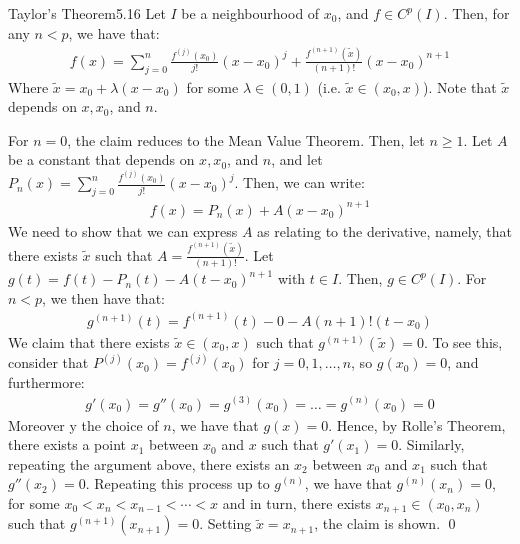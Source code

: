\begin{theorem}{Taylor's Theorem}{5.16}
    Let $I$ be a neighbourhood of $x_0$, and $f \in C^p(I)$. Then, for any $n < p$, we have that:
    \begin{align*}
        f(x) = \sum_{j=0}^n \frac{f^{(j)}(x_0)}{j!}(x- x_0)^j + \frac{f^{(n+1)}(\tilde{x})}{(n+1)!}(x - x_0)^{n+1}
    \end{align*}
    Where $\tilde{x} = x_0 + \lambda(x - x_0)$ for some $\lambda \in (0, 1)$ (i.e. $\tilde{x} \in (x_0, x)$). Note that $\tilde{x}$ depends on $x, x_0$, and $n$. 
\end{theorem}
\begin{nproof}
    For $n = 0$, the claim reduces to the Mean Value Theorem. Then, let $n \geq 1$. Let $A$ be a constant that depends on $x, x_0$, and $n$, and let $P_n(x) = \sum_{j=0}^n \frac{f^{(j)}(x_0)}{j!}(x-x_0)^j$. Then, we can write:
    \begin{align*}
        f(x) = P_n(x) + A(x-x_0)^{n+1}
    \end{align*}
    We need to show that we can express $A$ as relating to the derivative, namely, that there exists $\tilde{x}$ such that $A = \frac{f^{(n+1)}(\tilde{x})}{(n+1)!}$. Let $g(t) = f(t) - P_n(t) - A(t - x_0)^{n+1}$ with $t \in I$. Then, $g \in C^{p}(I)$. For $n < p$, we then have that:
    \begin{align*}
        g^{(n+1)}(t) = f^{(n+1)}(t) - 0 - A(n+1)!(t - x_0)
    \end{align*}
    We claim that there exists $\tilde{x} \in (x_0, x)$ such that $g^{(n+1)}(\tilde{x}) = 0$. To see this, consider that $P^{(j)}(x_0) = f^{(j)}(x_0)$ for $j = 0, 1, \ldots, n$, so $g(x_0) = 0$, and furthermore:
    \begin{align*}
        g'(x_0) = g''(x_0) = g^{(3)}(x_0) = \ldots = g^{(n)}(x_0) = 0
    \end{align*}
    Moreover y the choice of $n$, we have that $g(x) = 0$. Hence, by Rolle's Theorem, there exists a point $x_1$ between $x_0$ and $x$ such that $g'(x_1) = 0$. Similarly, repeating the argument above, there exists an $x_2$ between $x_0$ and $x_1$ such that $g''(x_2) = 0$. Repeating this process up to $g^{(n)}$, we have that $g^{(n)}(x_n) = 0$, for some $x_0 < x_{n} < x_{n-1} < \cdots < x$ and in turn, there exists $x_{n+1} \in (x_0, x_n)$ such that $g^{(n+1)}(x_{n+1}) = 0$. Setting $\tilde{x} = x_{n+1}$, the claim is shown. \qed
\end{nproof}


